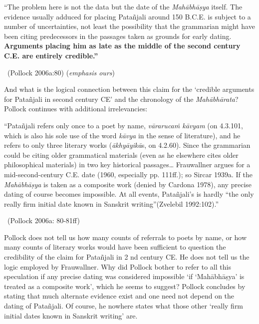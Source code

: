 \begin{myquote}
“The problem here is not the data but the date of the \textit{Mahābhāṣya} itself. The evidence usually adduced for placing Patañjali around 150 B.C.E. is subject to a number of uncertainties, not least the possibility that the grammarian might have been citing predecessors in the passages taken as grounds for early dating. \textbf{Arguments placing him as late as the middle of the second century C.E. are entirely credible.”} 

~\hfill (Pollock 2006a:80) (\textit{emphasis ours})
\end{myquote}

And what is the logical connection between this claim for the ‘credible arguments for Patañjali in second century CE’ and the chronology of the \textit{Mahābhārata}? Pollock continues with additional irrelevancies:

\begin{myquote}
“Patañjali refers only once to a poet by name, \textit{vārarucaṁ kāvyam} (on 4.3.101, which is also his sole use of the word \textit{kāvya} in the sense of literature), and he refers to only three literary works (\textit{ākhyāyikā}s, on 4.2.60). Since the grammarian could be citing older grammatical materials (even as he elsewhere cites older philosophical materials) in two key historical passages… Frauwallner argues for a mid-second-century C.E. date (1960, especially pp. 111ff.); so Sircar 1939a. If the \textit{Mahābhāṣya} is taken as a composite work (denied by Cardona 1978), any precise dating of course becomes impossible. At all events, Patañjali’s is hardly “the only really ﬁrm initial date known in Sanskrit writing”(Zvelebil 1992:102).” 

~\hfill (Pollock 2006a: 80-81ff)
\end{myquote}

Pollock does not tell us how many counts of referrals to poets by name, or how many counts of literary works would have been sufficient to question the credibility of the claim for Patañjali in 2 nd century CE. He does not tell us the logic employed by Frauwallner. Why did Pollock bother to refer to all this speculation if any precise dating was considered impossible ‘if ‘Mahābhāṣya’ is treated as a composite work’, which he seems to suggest? Pollock concludes by stating that much alternate evidence exist and one need not depend on the dating of Patañjali. Of course, he nowhere states what those other ‘really firm initial dates known in Sanskrit writing’ are.


